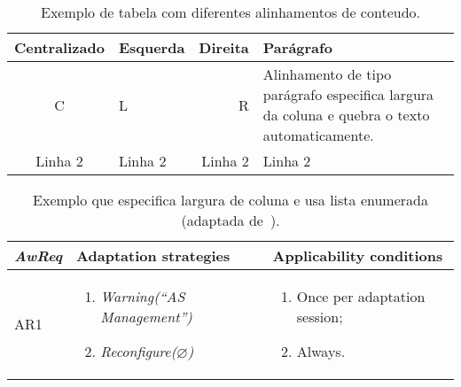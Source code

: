 \begin{table}
\caption{Exemplo de tabela com diferentes alinhamentos de conteudo.}
\label{tbl-intro-exemplo01}
\centering
\begin{tabular}{ | c | l | r | p{40mm} |}\hline
\textbf{Centralizado} & \textbf{Esquerda} & \textbf{Direita} & \textbf{Parágrafo}\\\hline
C & L & R & Alinhamento de tipo parágrafo especifica largura da coluna e quebra o texto automaticamente.\\
\hline
Linha 2 & Linha 2 & Linha 2 & Linha 2\\
\hline
\end{tabular}
\end{table}

\begin{table}
\caption{Exemplo que especifica largura de coluna e usa lista enumerada (adaptada de~\cite{souza-mylopoulos:spe13}).}
\label{tbl-intro-exemplo02}
\centering
\renewcommand{\arraystretch}{1.2}
\begin{small}
\begin{tabular}{ | p{15mm} | p{77mm} | p{55mm} |}\hline
\textbf{\textit{AwReq}} & \textbf{Adaptation strategies} & \textbf{Applicability conditions}\\\hline

AR1 &
\vspace{-2mm}\begin{enumerate}[topsep=0cm, partopsep=0cm, itemsep=0cm, parsep=0cm, leftmargin=0.5cm]
\item \textit{Warning(``AS Management'')}
\item \textit{Reconfigure($\varnothing$)}
\end{enumerate}\vspace{-4mm} &
\vspace{-2mm}\begin{enumerate}[topsep=0cm, partopsep=0cm, itemsep=0cm, parsep=0cm, leftmargin=0.5cm]
\item Once per adaptation session;
\item Always.
\end{enumerate}\vspace{-4mm}
\\\hline


\end{tabular}
\end{small}
\end{table}
